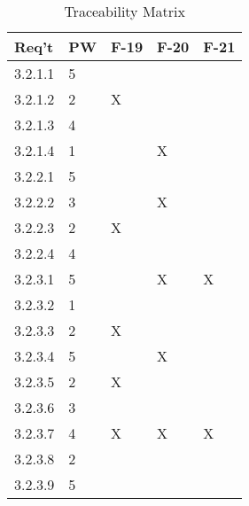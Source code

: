 \documentclass[12pt, titlepage]{article}
\begin{document}
	\begin{table}[h!]
    \caption{Traceability Matrix}
    \begin{center}
	\begin{tabular}{|p{1.5cm}|p{1.0cm}|p{1.0cm}p{1.0cm}p{1.0cm}|}
	\hline
	\textbf{Req't} & \textbf{PW} & \textbf{F-19} & \textbf{F-20} & \textbf{F-21}\\
	\hline
	\hline
      3.2.1.1 & 5 &  &  &\\
      3.2.1.2 & 2 & X & &\\
      3.2.1.3 &4  &  &&\\
      3.2.1.4 &1&   & X& \\
      3.2.2.1 &5&   & &\\
      3.2.2.2 &3&&X&\\
      3.2.2.3 &2&X&&\\
      3.2.2.4 &4&&&\\
      3.2.3.1 &5&&X&X\\
      3.2.3.2 &1&&&\\
      3.2.3.3 &2&X&&\\
      3.2.3.4 &5&&X&\\
      3.2.3.5 &2&X&&\\
      3.2.3.6 &3&&&\\
      3.2.3.7 &4&X&X&X\\
      3.2.3.8 &2&&&\\
      3.2.3.9 &5&&&\\
      \hline
	\end{tabular}
    \end{center}
	\end{table}
	\newpage
	
\end{document}
